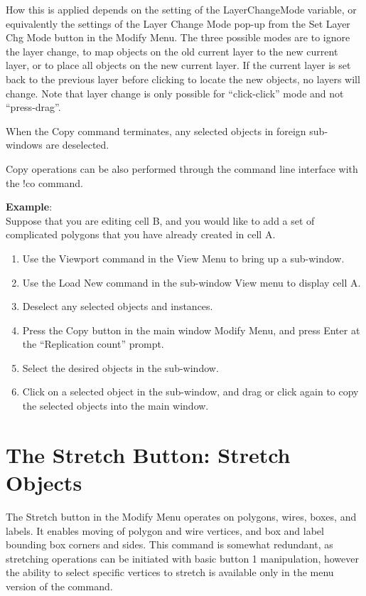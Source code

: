 How this is applied depends on the setting of the {\et
LayerChangeMode} variable, or equivalently the settings of the {\cb
Layer Change Mode} pop-up from the {\cb Set Layer Chg Mode} button
in the {\cb Modify Menu}.  The three possible modes are to ignore the
layer change, to map objects on the old current layer to the new
current layer, or to place all objects on the new current layer.  If
the current layer is set back to the previous layer before clicking to
locate the new objects, no layers will change.  Note that layer change
is only possible for ``click-click'' mode and not ``press-drag''.

When the {\cb Copy} command terminates, any selected objects in
foreign sub-windows are deselected.

Copy operations can be also performed through the command line
interface with the {\cb !co} command.

{\bf Example}:\\
Suppose that you are editing cell B, and you would like to add a     
set of complicated polygons that you have already created in cell A.

\begin{enumerate}
\item{Use the {\cb Viewport} command in the {\cb View Menu} to bring up
a sub-window.}
\item{Use the {\cb Load New} command in the sub-window {\cb View} menu
to display cell A.}
\item{Deselect any selected objects and instances.}
\item{Press the {\cb Copy} button in the main window {\cb Modify Menu},
and press {\kb Enter} at the ``Replication count'' prompt.}
\item{Select the desired objects in the sub-window.}
\item{Click on a selected object in the sub-window, and drag or click
again to copy the selected objects into the main window.}
\end{enumerate}

\section{The {\cb Stretch} Button: Stretch Objects}
The {\cb Stretch} button in the {\cb Modify Menu} operates on
polygons, wires, boxes, and labels.  It enables moving of polygon and
wire vertices, and box and label bounding box corners and sides.  This
command is somewhat redundant, as stretching operations can be
initiated with basic button 1 manipulation, however the ability to
select specific vertices to stretch is available only in the menu
version of the command.

